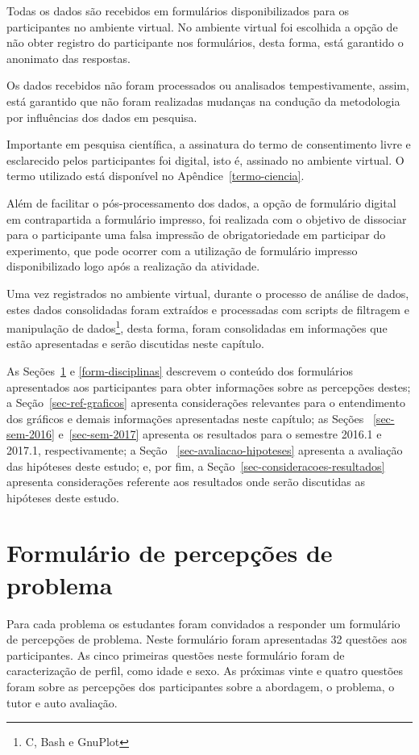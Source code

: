 Todas os dados são recebidos em formulários
disponibilizados para os participantes no ambiente virtual.
No ambiente virtual foi escolhida a opção de não
obter registro do participante nos formulários, desta forma,
está garantido o anonimato das respostas.

Os dados recebidos não foram processados ou analisados
tempestivamente, assim, está garantido que não foram
realizadas mudanças na condução da metodologia
por influências dos dados em pesquisa.

Importante em pesquisa científica, a assinatura do termo
de consentimento livre e esclarecido pelos participantes foi digital,
isto é, assinado no ambiente virtual.
O termo utilizado está disponível no Apêndice~\ref{termo-ciencia}.

Além de facilitar o pós-processamento dos dados, a opção de
formulário digital em contrapartida a formulário impresso, foi
realizada com o objetivo de dissociar para o participante
uma falsa impressão de obrigatoriedade em participar do experimento,
que pode ocorrer com a utilização de formulário impresso disponibilizado
logo após a realização da atividade.


Uma vez registrados no ambiente virtual, durante o processo de análise de dados,
estes dados consolidadas foram extraídos e processadas com scripts de filtragem
e manipulação de dados\footnote{C, Bash e GnuPlot}, desta forma, foram consolidadas em informações que estão
apresentadas e serão discutidas neste capítulo.

As Seções~\ref{form-percepcoes} e \ref{form-disciplinas} descrevem
o conteúdo dos formulários apresentados aos participantes para obter
informações sobre as percepções destes;
a Seção~\ref{sec-ref-graficos} apresenta considerações relevantes para o
entendimento dos gráficos e demais informações apresentadas neste capítulo;
as Seções ~\ref{sec-sem-2016} e~\ref{sec-sem-2017}
apresenta os resultados para o semestre 2016.1 e 2017.1, respectivamente;
a Seção ~\ref{sec-avaliacao-hipoteses} apresenta a avaliação das
hipóteses deste estudo;
e, por fim, a Seção~\ref{sec-consideracoes-resultados} apresenta
considerações referente aos resultados onde serão discutidas
as hipóteses deste estudo.

\section{Formulário de percepções de problema}
\label{form-percepcoes}
Para cada problema os estudantes foram convidados a responder um formulário de percepções de problema.
Neste formulário foram apresentadas 32 questões aos participantes.
As cinco primeiras questões neste formulário foram de caracterização de perfil, como
idade e sexo.
As próximas vinte e quatro questões foram sobre as percepções dos participantes sobre a abordagem, o
problema, o tutor e auto avaliação.

